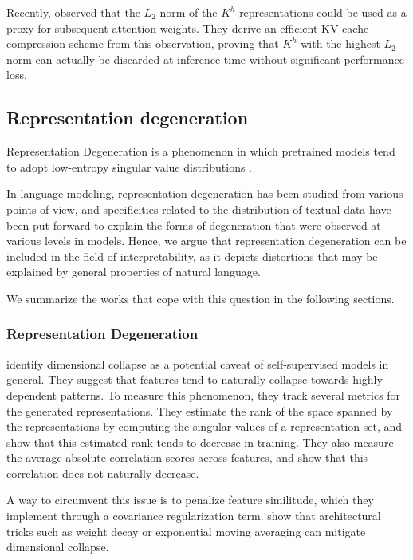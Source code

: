 Recently, \citet{devoto2024simpleeffectivel2normbased} observed that the $L_2$ norm of the $K^h$ representations could be used as a proxy for subsequent attention weights. They derive an efficient KV cache compression scheme from this observation, proving that $K^h$ with the highest $L_2$ norm can actually be discarded at inference time without significant performance loss.

\subsection{Representation degeneration}

Representation Degeneration is a phenomenon in which pretrained models tend to adopt low-entropy singular value distributions \citep{jing2022understanding}.

In language modeling, representation degeneration has been studied from various points of view, and specificities related to the distribution of textual data have been put forward to explain the forms of degeneration that were observed at various levels in models. Hence, we argue that representation degeneration can be included in the field of interpretability, as it depicts distortions that may be explained by general properties of natural language.

We summarize the works that cope with this question in the following sections.

\subsubsection{Representation Degeneration}

\citet{9709917} identify dimensional collapse as a potential caveat of self-supervised models in general. They suggest that features tend to naturally collapse towards highly dependent patterns. To measure this phenomenon, they track several metrics for the generated representations. They estimate the rank of the space spanned by the representations by computing the singular values of a representation set, and show that this estimated rank tends to decrease in training. They also measure the average absolute correlation scores across features, and show that this correlation does not naturally decrease. 

A way to circumvent this issue is to penalize feature similitude, which they implement through a covariance regularization term. \citet{pmlr-v139-tian21a} show that architectural tricks such as weight decay \citep{weight_decay} or exponential moving averaging \citep{morales-brotons2024exponential} can mitigate dimensional collapse.

